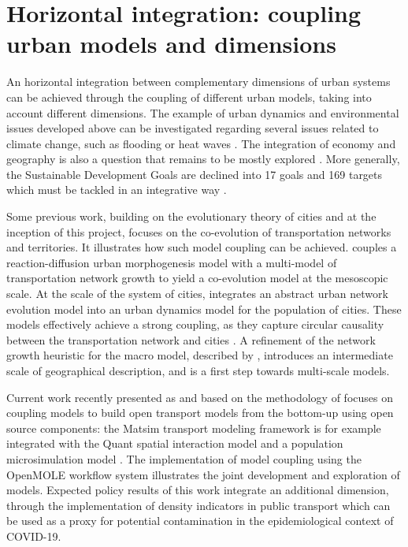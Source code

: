 \section{Horizontal integration: coupling urban models and dimensions}

An horizontal integration between complementary dimensions of urban systems can be achieved through the coupling of different urban models, taking into account different dimensions. The example of urban dynamics and environmental issues developed above can be investigated regarding several issues related to climate change, such as flooding \cite{ford2019multi} or heat waves \cite{lemonsu2015vulnerability}. The integration of economy and geography is also a question that remains to be mostly explored \cite{marchionni2004geographical}. More generally, the Sustainable Development Goals are declined into 17 goals and 169 targets which must be tackled in an integrative way \cite{stafford2017integration}.


Some previous work, building on the evolutionary theory of cities and at the inception of this project, focuses on the co-evolution of transportation networks and territories. It illustrates how such model coupling can be achieved. \cite{raimbault2019urban} couples a reaction-diffusion urban morphogenesis model with a multi-model of transportation network growth to yield a co-evolution model at the mesoscopic scale. At the scale of the system of cities, \cite{raimbault2021modeling} integrates an abstract urban network evolution model into an urban dynamics model for the population of cities. These models effectively achieve a strong coupling, as they capture circular causality between the transportation network and cities \cite{raimbault2020unveiling}. A refinement of the network growth heuristic for the macro model, described by \cite{raimbault2020hierarchy}, introduces an intermediate scale of geographical description, and is a first step towards multi-scale models.



Current work recently presented as \cite{raimbault2021estimating} and based on the methodology of \cite{raimbault2021building} focuses on coupling models to build open transport models from the bottom-up using open source components: the Matsim transport modeling framework \cite{horni2016multi} is for example integrated with the Quant spatial interaction model \cite{batty2021new} and a population microsimulation model \cite{lomax2017microsimulation}. The implementation of model coupling using the OpenMOLE workflow system \cite{passerat2017reproducible} illustrates the joint development and exploration of models. Expected policy results of this work integrate an additional dimension, through the implementation of density indicators in public transport which can be used as a proxy for potential contamination in the epidemiological context of COVID-19.

